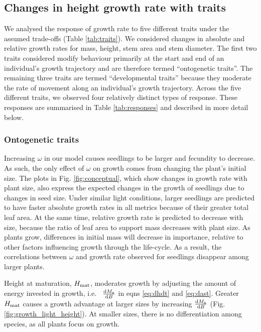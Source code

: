 \documentclass[9pt,twocolumn,twoside,lineno]{pnas-new}
\begin{document}
\subsection{Changes in height growth rate with traits}

We analysed the response of growth rate to five different traits under the assumed trade-offs (Table \ref{tab:traits}). We considered changes in absolute and relative growth rates for mass, height, stem area and stem diameter. The first two traits considered modify behaviour primarily at the start and end of an individual's growth trajectory and are therefore termed ``ontogenetic traits''. The remaining three traits are termed ``developmental traits'' because they moderate the rate of movement along an individual's growth trajectory. Across the five different traits, we observed four relatively distinct types of response. These responses are summarised in Table \ref{tab:responses} and described in more detail below.

\subsubsection{Ontogenetic traits}  Increasing $\omega$ in our model causes seedlings to be larger and fecundity to decrease. As such, the only effect of $\omega$ on growth comes from changing the plant's initial size. The plots in Fig. \ref{fig:conceptual}, which show changes in growth rate with plant size, also express the expected changes in the growth of seedlings due to changes in seed size. Under similar light conditions, larger seedlings are predicted to have faster absolute growth rates in all metrics because of their greater total leaf area. At the same time, relative growth rate is predicted to decrease with size, because the ratio of leaf area to support mass decreases with plant size. As plants grow, differences in initial mass will decrease in importance, relative to other factors influencing growth through the life-cycle. As a result, the correlations between $\omega$ and growth rate observed for seedlings disappear among larger plants.

Height at maturation, $H_{{\rm mat}}$, moderates growth by adjusting the amount of energy invested in growth, i.e.~ $\frac{{\rm d}M_{\rm a}}{{\rm d}B}$ in eqns \ref{eq:dhdt} and \ref{eq:dast}. Greater $H_{{\rm mat}}$ causes a growth advantage at larger sizes by increasing $\frac{{\rm d}M_{\rm a}}{{\rm d}B}$ (Fig. \ref{fig:growth_light_height}). At smaller sizes, there is no differentiation among species, as all plants focus on growth.
\end{document}
